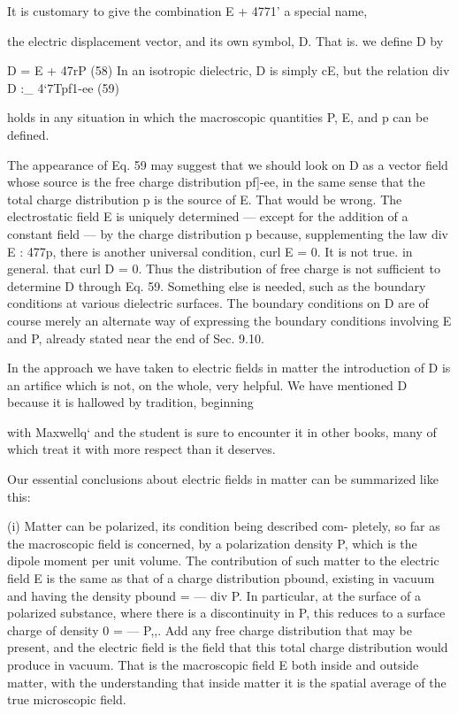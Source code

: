 {{It is customary to give the combination E + 4771' a special name,

the electric displacement vector, and its own symbol, D. That is. we
define D by

\begin{equation}
\end{equation}
D = E + 47rP (58)
In an isotropic dielectric, D is simply cE, but the relation
div D :_ 4‘7Tpf1-ee (59)

holds in any situation in which the macroscopic quantities P, E, and
p can be defined.

The appearance of Eq. 59 may suggest that we should look on D
as a vector field whose source is the free charge distribution pf]-ee, in
the same sense that the total charge distribution p is the source of E.
That would be wrong. The electrostatic field E is uniquely determined
--- except for the addition of a constant field --- by the charge
distribution p because, supplementing the law div E : 477p, there
is another universal condition, curl E = 0. It is not true. in general.
that curl D = 0. Thus the distribution of free charge is not sufficient
to determine D through Eq. 59. Something else is needed, such as
the boundary conditions at various dielectric surfaces. The boundary
conditions on D are of course merely an alternate way of expressing
the boundary conditions involving E and P, already stated near
the end of Sec. 9.10.

In the approach we have taken to electric fields in matter the introduction
of D is an artifice which is not, on the whole, very helpful.
We have mentioned D because it is hallowed by tradition, beginning

with Maxwellq‘ and the student is sure to encounter it in other books,
many of which treat it with more respect than it deserves.

Our essential conclusions about electric fields in matter can be
summarized like this:

(i) Matter can be polarized, its condition being described com-
pletely, so far as the macroscopic field is concerned, by a
polarization density P, which is the dipole moment per unit
volume. The contribution of such matter to the electric
field E is the same as that of a charge distribution pbound,
existing in vacuum and having the density pbound =  --- div P.
In particular, at the surface of a polarized substance, where
there is a discontinuity in P, this reduces to a surface charge
of density 0 =  --- P,,. Add any free charge distribution that
may be present, and the electric field is the field that this
total charge distribution would produce in vacuum. That
is the macroscopic field E both inside and outside matter,
with the understanding that inside matter it is the spatial
average of the true microscopic field.

}}
